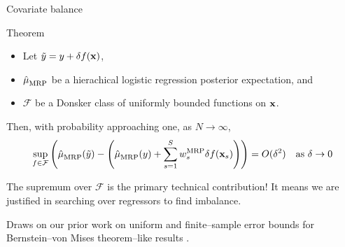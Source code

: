\begin{frame}[t]{Covariate balance}

\begin{block}{Theorem}
    \begin{itemize}
        \item Let $\tilde{y} = y + \delta f(\mathbf{x})$,
        \item $\hat{\mu}^{}_{\mathrm{MRP}}$ be a hierachical logistic regression posterior expectation, and
        \item $\mathcal{F}$ be a Donsker class of uniformly bounded functions on $\mathbf{x}$.
    \end{itemize}
    Then, with probability approaching one, as $N \rightarrow \infty$,
    $$
    \begin{aligned}
        \sup_{f \in \mathcal{F}} \left(
            \hat{\mu}^{}_{\mathrm{MRP}}(\tilde{y}) -
            \left(\hat{\mu}^{}_{\mathrm{MRP}}(y) + \sum_{s=1}^S w_s^{\mathrm{MRP}} \delta f(\mathbf{x}_s) \right)
            \right)
        = O(\delta^2)
        \quad\textrm{as }\delta \rightarrow 0
    \end{aligned}
    $$
\end{block}

The supremum over $\mathcal{F}$ is the primary technical contribution!
It means we are justified in searching over regressors
to find imbalance.

Draws on our prior work on uniform and finite--sample error bounds for Bernstein--von Mises
theorem--like results \citep{giordano:2024:bayesij,kasprzak:2025:laplace}.


\end{frame}





